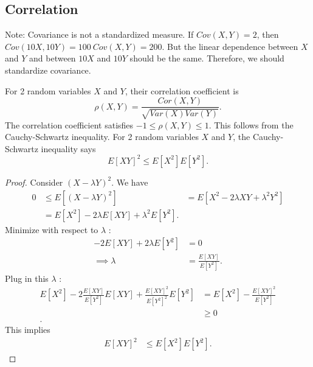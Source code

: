 \subsection{Correlation}

Note: Covariance is not a standardized measure. If $Cov\left( X, Y \right) = 2$, then $Cov\left( 10X, 10Y \right) = 100\ Cov\left( X, Y \right) = 200 $. But the linear dependence between $X$ and $Y$ and between $10X$ and $10 Y $ should be the same. Therefore, we should standardize covariance. 

\begin{definition}
	For 2 random variables $X$ and $Y$, their correlation coefficient is 
	\[
		\rho\left( X, Y \right) = \frac{Cor\left( X, Y \right) }{\sqrt{Var\left( X \right) Var\left( Y \right) } }
	.\] 
	The correlation coefficient satisfies $-1 \le  \rho\left( X, Y \right) \le  1$. This follows from the Cauchy-Schwartz inequality. For 2 random variables $X$ and $Y$, the Cauchy-Schwartz inequality says 
	\[
		E\left[ XY \right] ^2 \le  E\left[ X^2  \right] E\left[ Y^2 \right] 
	.\]
	\begin{proof}
		Consider $\left( X - \lambda Y \right) ^2$. We have 
		\begin{align*}
			0 &\le E\left[ \left( X - \lambda Y  \right) ^2 \right] 
			&= E\left[ X^2 - 2\lambda XY + \lambda^2 Y^2 \right]  \\
			&= E\left[ X^2 \right] - 2\lambda E\left[ XY \right] + \lambda^2 E\left[ Y^2 \right] 
		.\end{align*}
		Minimize with respect to $\lambda$ : 
		\begin{align*}
			-2 E\left[ XY \right] + 2 \lambda E\left[ Y^2 \right] &= 0 \\
			\implies \lambda &= \frac{E\left[ XY \right] }{E\left[ Y^2 \right] } 
		.\end{align*}
		Plug in this $\lambda$ : 
		\begin{align*}
			E\left[ X^2 \right] - 2 \frac{E\left[ XY \right] }{E\left[ Y^2 \right] }E\left[ XY \right]  + \frac{E\left[ XY \right] ^2}{E\left[ Y^2 \right] ^2}E\left[ Y^2 \right] &= E\left[ X^2 \right] - \frac{E\left[ XY \right] ^2}{E\left[ Y^2 \right] } \\
																								 &\ge 0 \\
		.\end{align*}
		This implies 
		\begin{align*}
			E\left[ XY \right] ^2 &\le E\left[ X^2 \right] E\left[ Y^2 \right] 
		.\end{align*}

\end{proof}
\end{definition}
